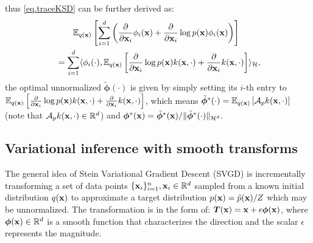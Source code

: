 \documentclass{article}
\begin{document}
thus \eqref{eq.traceKSD} can be further derived as:
\begin{align}
    &\qquad \mathbb{E}_{q({\mathbf{x}})} \left[ \sum_{i=1}^d\left( \frac{\partial}{\partial {\mathbf{x}}_i}\phi_i({\mathbf{x}}) + \frac{\partial}{\partial {\mathbf{x}}_i}\log p({\mathbf{x}})\phi_i({\mathbf{x}}) \right) \right] \\
    &= \sum_{i=1}^d \langle \phi_i(\cdot), \mathbb{E}_{q({\mathbf{x}})}\left[ \frac{\partial}{\partial {\mathbf{x}}_i}\log p({\mathbf{x}}) k({\mathbf{x}}, \cdot) + \frac{\partial}{\partial {\mathbf{x}}_i} k({\mathbf{x}}, \cdot) \right] \rangle_{\mathcal{H}},
\end{align}
the optimal unnormalized $\tilde{\bm \phi}(\cdot)$ is given by simply setting its $i$-th entry to $\mathbb{E}_{q({\mathbf{x}})}\left[ \frac{\partial}{\partial {\mathbf{x}}_i}\log p({\mathbf{x}}) k({\mathbf{x}}, \cdot) + \frac{\partial}{\partial {\mathbf{x}}_i} k({\mathbf{x}}, \cdot) \right]$, which means $\tilde{\bm \phi}^*(\cdot) = \mathbb{E}_{q({\mathbf{x}})}\left[ \mathcal{A}_p k({\mathbf{x}}, \cdot) \right]$ (note that $\mathcal{A}_p k({\mathbf{x}}, \cdot) \in \mathbb{R}^{d}$) and $\bm \phi^*({\mathbf{x}}) = \tilde{\bm \phi}^*({\mathbf{x}}) / \|\tilde{\bm \phi}^*(\cdot)\|_{\mathcal{H}^d}$.

\subsection{Variational inference with smooth transforms}
The general idea of Stein Variational Gradient Descent (SVGD) \citep{liu2016SVGD} is incrementally transforming a set of data points $\{{\mathbf{x}}_i\}_{i=1}^n, {\mathbf{x}}_i \in \mathbb{R}^d$ sampled from a known initial distribution $q({\mathbf{x}})$ to approximate a target distribution $p({\mathbf{x}}) = \tilde{p}({\mathbf{x}}) / Z$ which may be unnormalized. The transformation is in the form of: $\bm T({\mathbf{x}}) = {\mathbf{x}} + \epsilon \bm\phi({\mathbf{x}})$, where $\bm\phi({\mathbf{x}}) \in \mathbb{R}^d$ is a smooth function that characterizes the direction and the scalar $\epsilon$ represents the magnitude.
\end{document}
